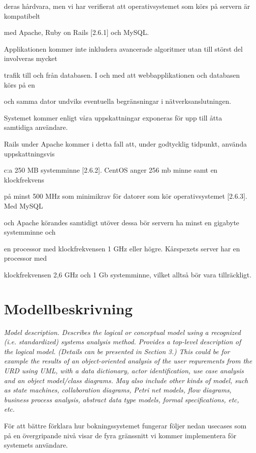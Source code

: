\documentclass[a4paper, twoside, 11pt, titlepage]{article}
\begin{document}
	deras hårdvara, men vi har verifierat att operativsystemet som körs på servern är kompatibelt

	med Apache, Ruby on Rails [2.6.1] och MySQL.

	Applikationen kommer inte inkludera avancerade algoritmer utan till störst del involveras mycket

	trafik till och från databasen. I och med att webbapplikationen och databasen körs på en

	och samma dator undviks eventuella begränsningar i nätverksanslutningen.

	Systemet kommer enligt våra uppskattningar exponeras för upp till åtta samtidiga användare.

	Rails under Apache kommer i detta fall att, under godtycklig tidpunkt, använda uppskattningsvis

	c:a 250 MB systemminne [2.6.2]. CentOS anger 256 mb minne samt en klockfrekvens

	på minst 500 MHz som minimikrav för datorer som kör operativsystemet [2.6.3]. Med MySQL

	och Apache körandes samtidigt utöver dessa bör servern ha minst en gigabyte systemminne och

	en processor med klockfrekvensen 1 GHz eller högre. Kårspexets server har en processor med

	klockfrekvensen 2,6 GHz och 1 Gb systemminne, vilket alltså bör vara tillräckligt.

\clearpage
\section{Modellbeskrivning}


\emph{Model description. Describes the logical or conceptual model using a recognized (i.e. standardized) systems analysis method. Provides a top-level description of the logical model. (Details can be presented in Section 3.) This could be for example the results of an object-oriented analysis of the user requrements from the URD using UML, with a data dictionary, actor identification, use case analysis and an object model/class diagrams. May also include other kinds of model, such as state machines, collaboration diagrams, Petri net models, flow diagrams, business process analysis, abstract data type models, formal specifications, etc, etc.}

För att bättre förklara hur bokningssystemet fungerar följer nedan usecases som på en övergripande nivå visar de fyra gränssnitt vi kommer implementera för systemets användare.
\end{document}
